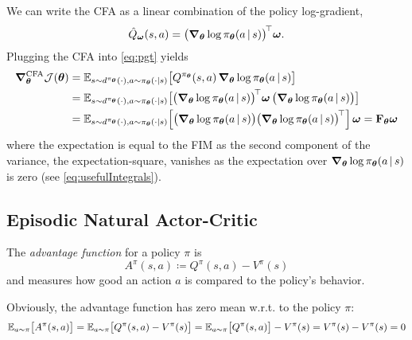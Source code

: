 			We can write the \ac{CFA} as a linear combination of the policy log-gradient,
			\begin{equation}
				\hat{Q}_{\bm{\omega}}(s, a) = \bigl( \grad_{\bm{\theta}} \log \pi_{\bm{\theta}}(a \,\vert\, s) \bigr)^{{\!\top\!}\,} \bm{\omega}.
			\end{equation}
			Plugging the \ac{CFA} into \eqref{eq:pgt} yields
			\begin{align}
				\grad_{\bm{\theta}}^\mathrm{CFA} \mathcal{J}(\bm{\theta})
				 & = \mathbb{E}_{s \sim d^{\pi_{\bm{\theta}}}(\cdot), a \sim \pi_{\bm{\theta}}(\cdot \vert s)}\bigl[ Q^{\pi_{\bm{\theta}}}(s, a) \, \grad_{\bm{\theta}} \log \pi_{\bm{\theta}}(a \,\vert\, s) \bigr]                                                                                      \\
				 & = \mathbb{E}_{s \sim d^{\pi_{\bm{\theta}}}(\cdot), a \sim \pi_{\bm{\theta}}(\cdot \vert s)}\bigl[ \bigl( \grad_{\bm{\theta}} \log \pi_{\bm{\theta}}(a \,\vert\, s) \bigr)^{{\!\top\!}\,} \bm{\omega} \, \bigl( \grad_{\bm{\theta}} \log \pi_{\bm{\theta}}(a \,\vert\, s) \bigr) \bigr] \\
				 & = \mathbb{E}_{s \sim d^{\pi_{\bm{\theta}}}(\cdot), a \sim \pi_{\bm{\theta}}(\cdot \vert s)}\Bigl[ \bigl( \grad_{\bm{\theta}} \log \pi_{\bm{\theta}}(a \,\vert\, s) \bigr) \bigl( \grad_{\bm{\theta}} \log \pi_{\bm{\theta}}(a \,\vert\, s) \bigr)^{{\!\top\!}\,} \Bigr] \, \bm{\omega}
				= \bm{\mathrm{F}}_{\bm{\theta}} \bm{\omega}
			\end{align}
			where the expectation is equal to the \ac{FIM} as the second component of the variance, the expectation-square, vanishes as the expectation over \( \grad_{\bm{\theta}} \log \pi_{\bm{\theta}}(a \,\vert\, s) \) is zero (see \eqref{eq:usefulIntegrals}).

		\subsection{Episodic Natural Actor-Critic}
			\begin{definition}
				The \emph{advantage function} for a policy \(\pi\) is
				\begin{equation}
					A^\pi(s, a) \coloneqq Q^\pi(s, a) - V^\pi(s)
				\end{equation}
				and measures how good an action \(a\) is compared to the policy's behavior.
			\end{definition}
			Obviously, the advantage function has zero mean w.r.t. to the policy \(\pi\):
			\begin{equation}
				\mathbb{E}_{a \sim \pi}\bigl[ A^\pi(s, a) \bigr]
				= \mathbb{E}_{a \sim \pi}\bigl[ Q^\pi(s, a) - V^\pi(s) \bigr]
				= \mathbb{E}_{a \sim \pi}\bigl[ Q^\pi(s, a) \bigr] - V^\pi(s)
				= V^\pi(s) - V^\pi(s)
				= 0
			\end{equation}

